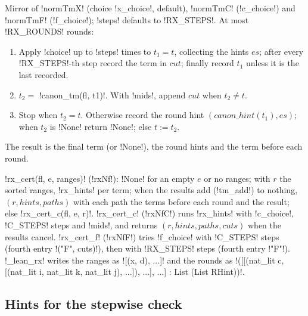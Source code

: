 {{{\begin{algorithm}\label{alg:lean-export-sym-rxhints}
Mirror of \lexlean!normTmX! (choice \lexpy!x_choice!, default), \lexlean!normTmC! (\lexpy!c_choice!) and
\lexlean!normTmF! (\lexpy!f_choice!); \lexpy!steps! defaults to \lexpy!RX_STEPS!. At most \lexpy!RX_ROUNDS!
rounds:
\begin{enumerate}
\item Apply \lexpy!choice! up to \lexpy!steps! times to $t_1 = t$, collecting the hints $es$; after
every \lexpy!RX_STEPS!-th step record the term in $\mathit{cut}$; finally record $t_1$ unless it
is the last recorded.
\item $t_2 = $ \lexpy!canon_tm(fl, t1)!. With \lexpy!mids!, append $\mathit{cut}$ when $t_2 \ne t$.
\item Stop when $t_2 = t$. Otherwise record the round hint
$(\mathit{canon\_hint}(t_1), es)$; when $t_2$ is \lexpy!None! return \lexpy!None!; else $t := t_2$.
\end{enumerate}
The result is the final term (or \lexpy!None!), the round hints and the term before each round.
\end{algorithm}
\lexpy!rx_cert(fl, e, ranges)! (\lexlean!rxNf!): \lexpy!None! for an empty $e$ or no ranges; with
$r$ the sorted ranges, \lexpy!rx_hints! per term; when the results add (\lexpy!tm_add!) to nothing,
$(r, \mathit{hints}, \mathit{paths})$ with each path the terms before each round and the
result; else \lexpy!rx_cert_c(fl, e, r)!. \lexpy!rx_cert_c! (\lexlean!rxNfC!) runs \lexpy!rx_hints! with
\lexpy!c_choice!, \lexpy!C_STEPS! steps and \lexpy!mids!, and returns
$(r, \mathit{hints}, \mathit{paths}, \mathit{cuts})$ when the results cancel. \lexpy!rx_cert_f!
(\lexlean!rxNfF!) tries \lexpy!f_choice! with \lexpy!C_STEPS! steps (fourth entry
\lexpy!("F", cuts)!), then with \lexpy!RX_STEPS! steps (fourth entry \lexpy!"F"!). \lexpy!_lean_rx!
writes the ranges as \lexlean![(x, d), ...]! and the rounds as
\lexlean!([[(nat_lit c, [(nat_lit i, nat_lit k, nat_lit j), ...]), ...], ...] : List (List RHint))!.

\subsection{Hints for the stepwise check}\label{sec:lean-export-sym-hints}

}}}
